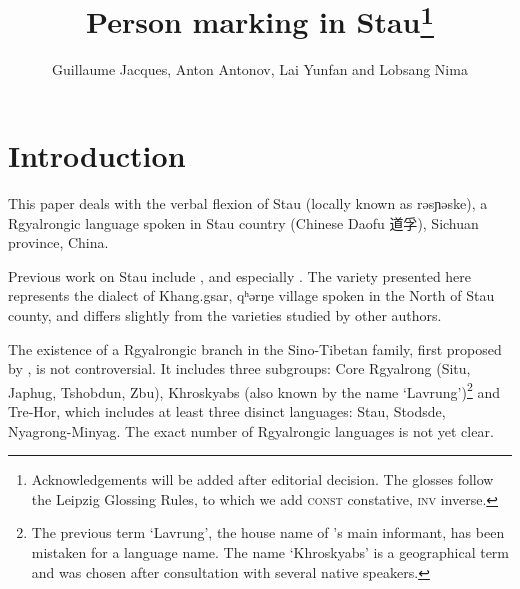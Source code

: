 \documentclass[oldfontcommands,oneside,a4paper,11pt]{article}
\newcommand{\ipa}[1]{{\phon #1}} %
\newcommand{\zh}[1]{{\cn #1}}
\begin{document}
 
\linenumbers

\title{Person marking in Stau\footnote{Acknowledgements will be added after editorial decision. The glosses follow the Leipzig Glossing Rules, to which we add \textsc{const} constative, \textsc{inv} inverse.
} } 
\author{Guillaume Jacques, Anton Antonov, Lai Yunfan and Lobsang Nima}

\maketitle

 
 \section{Introduction}


This paper deals with the verbal flexion of   Stau (locally known as \ipa{rəsɲəske}), a Rgyalrongic language  spoken in Stau country (Chinese Daofu \zh{道孚}), Sichuan province, China.

Previous work on Stau include \citet{huangbf91daofu}, \citet{jackson07shangzhai} and especially \citet{sun13gexi}. The variety presented here represents the dialect of Khang.gsar, \ipa{qʰərŋe} village spoken in the North of Stau county, and differs slightly from the varieties studied by other authors.

The existence of a Rgyalrongic branch in the Sino-Tibetan family, first proposed by \citet{jackson00sidaba}, is not controversial. It includes three subgroups: Core Rgyalrong (Situ, Japhug, Tshobdun, Zbu), Khroskyabs (also known by the name `Lavrung')\footnote{The previous term `Lavrung', the house name of \citet{huangbf07lavrung.zh}'s main informant, has been mistaken for a language name. The name `Khroskyabs' is a geographical term and was chosen after consultation with several native speakers. } and Tre-Hor, which includes at least three disinct languages: Stau, Stodsde, Nyagrong-Minyag. The exact number of Rgyalrongic languages is not yet clear.

 


\end{document}
